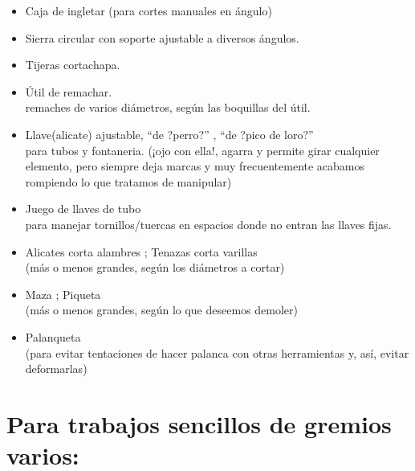 \documentclass[spanish,10pt,a4paper,final,oneside]{article}
\begin{document}
\begin{itemize}
\item Caja de ingletar (para cortes manuales en ángulo)

\item Sierra circular con soporte ajustable a diversos ángulos.

\item Tijeras cortachapa.

\item Útil de remachar.
\\remaches de varios diámetros, según las boquillas del útil.

\item Llave(alicate) ajustable, ``de ?perro?'' , ``de ?pico de loro?'' 
\\para tubos y fontaneria. (¡ojo con ella!, agarra y permite girar cualquier elemento, pero siempre deja marcas y muy frecuentemente acabamos rompiendo lo que tratamos de manipular)

\item Juego de llaves de tubo
\\para manejar tornillos/tuercas en espacios donde no entran las llaves fijas.

\item Alicates corta alambres ; Tenazas corta varillas
\\(más o menos grandes, según los diámetros a cortar)

\item Maza ; Piqueta
\\(más o menos grandes, según lo que deseemos demoler)

\item Palanqueta
\\(para evitar tentaciones de hacer palanca con otras herramientas y, así, evitar deformarlas)


\end{itemize}

\section*{Para trabajos sencillos de gremios varios:}
\end{document}
